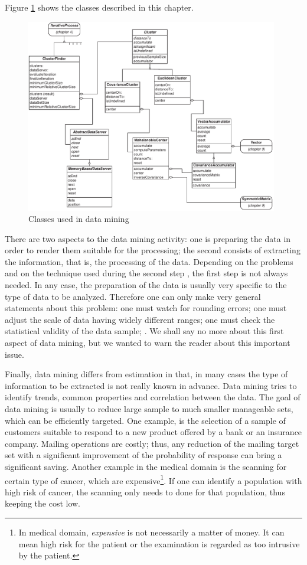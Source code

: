 \documentclass[twoside]{book}
\begin{document}
Figure \ref{fig:dataminingclasses} shows the classes described in
this chapter.
\begin{figure}
\centering\includegraphics[width=11cm]{Figures/DataminingClasses}
\caption{Classes used in data mining}\label{fig:dataminingclasses}
\end{figure}
There are two aspects to the data mining activity: one is
preparing the data in order to render them suitable for the
processing; the second consists of extracting the information,
that is, the processing of the data. Depending on the problems and
on the technique used during the second step , the first step is
not always needed. In any case, the preparation of the data is
usually very specific to the type of data to be analyzed.
Therefore one can only make very general statements about this
problem: one must watch for rounding errors; one must adjust the
scale of data having widely different ranges; one must check the
statistical validity of the data sample; \etc. We shall say no
more about this first aspect of data mining, but we wanted to warn
the reader about this important issue.

Finally, data mining differs from estimation in that, in many
cases the type of information to be extracted is not really known
in advance. Data mining tries to identify trends, common
properties and correlation between the data. The goal of data
mining is usually to reduce large sample to much smaller
manageable sets, which can be efficiently targeted. One example,
is the selection of a sample of customers suitable to respond to a
new product offered by a bank or an insurance company. Mailing
operations are costly; thus, any reduction of the mailing target
set with a significant improvement of the probability of response
can bring a significant saving. Another example in the medical
domain is the scanning for certain type of cancer, which are
expensive\footnote{In medical domain, {\sl expensive} is not
necessarily a matter of money. It can mean high risk for the
patient or the examination is regarded as too intrusive by the
patient.}. If one can identify a population with high risk of
cancer, the scanning only needs to done for that population, thus
keeping the cost low.
\end{document}
